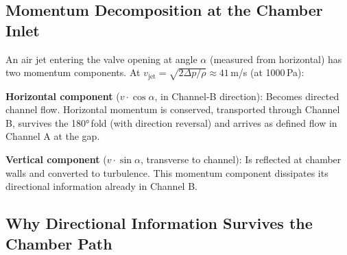 \documentclass[11pt,a4paper]{article}
\begin{document}
\subsection{Momentum Decomposition at the Chamber Inlet}

An air jet entering the valve opening at angle $\alpha$ (measured from horizontal) has two momentum components. At $v_\text{jet} = \sqrt{2\Delta p/\rho} \approx 41$\,m/s (at 1000\,Pa):

\begin{table}[H]
\centering\small
{}
\caption{Momentum decomposition of the entry jet at the chamber inlet}
\end{table}

\textbf{Horizontal component} ($v \cdot \cos\alpha$, in Channel-B direction): Becomes directed channel flow. Horizontal momentum is conserved, transported through Channel B, survives the 180°\,fold (with direction reversal) and arrives as defined flow in Channel A at the gap.

\textbf{Vertical component} ($v \cdot \sin\alpha$, transverse to channel): Is reflected at chamber walls and converted to turbulence. This momentum component dissipates its directional information already in Channel B.

\subsection{Why Directional Information Survives the Chamber Path}
\end{document}
